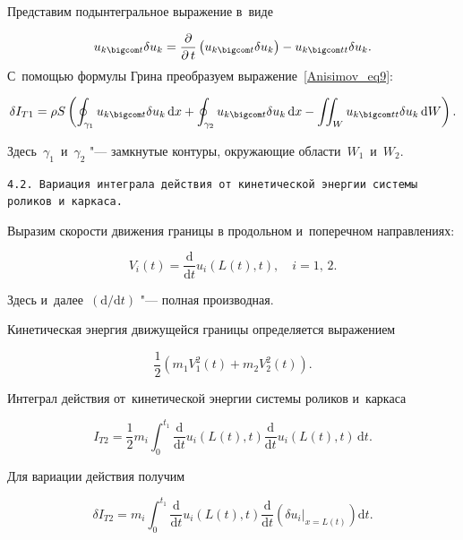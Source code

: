 Представим подынтегральное выражение в~виде 

$$u_{k \bigcom t}\delta u_k= \frac{\partial}{\partial\,t}\left(u_{k \bigcom t}\delta u_k\right)-u_{k \bigcom tt}\delta u_k.$$ С~помощью формулы Грина преобразуем выражение~\eqref{Anisimov_eq9}:

\begin{equation}\label{Anisimov_eq10}

\delta I_{T1}=\rho S\left(\oint_{\gamma_1}u_{k \bigcom t}\delta u_k\,\mathrm{d}x+ \oint_{\gamma_2}u_{k \bigcom t}\delta u_k\,\mathrm{d}x-\iint_{W}u_{k \bigcom tt}\delta u_k\,\mathrm{d}W\right).

\end{equation}

Здесь~$\gamma_1$~и~$\gamma_2$ "---  замкнутые контуры, окружающие области~$W_1$~и~$W_2$.



\smallskip



{\tt 4.2. Вариация интеграла действия от~кинетической энергии системы \linebreak роликов и~каркаса.} 

Выразим скорости движения границы в продольном и~поперечном направлениях:

\begin{equation}\nonumber

V_i(t)=\frac{\mathrm{d}}{\mathrm{d}t} u_i (L(t), t) ,\quad i=1,\,2.

\end{equation}

Здесь и~далее~$\left({\mathrm{d}}/{\mathrm{d}t}\right)$ "---  полная производная. 

Кинетическая энергия движущейся границы определяется выражением 

$$\frac12\left(m_1V_1^2(t)+m_2V_2^2(t)\right).$$

Интеграл действия от~кинетической энергии системы роликов и~каркаса 

\begin{equation}\nonumber

I_{T2}=\frac12m_i\int_0^{t_1}\frac{\mathrm{d}}{\mathrm{d}t} u_i( L(t), t ) \frac{\mathrm{d}}{\mathrm{d}t} u_i( L(t), t ) \,\mathrm{d}t.

\end{equation}

Для вариации действия получим

\begin{equation}\label{Anisimov_eq11}

\delta I_{T2}=m_i\int_0^{t_1}\frac{\mathrm{d}}{\mathrm{d}t} u_i( L(t), t ) \frac{\mathrm{d}}{\mathrm{d}t}\left(\delta u_i\big|_{x=L(t)}\right)\mathrm{d}t.

\end{equation}

